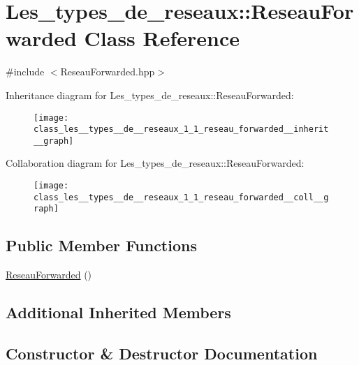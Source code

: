 \hypertarget{class_les__types__de__reseaux_1_1_reseau_forwarded}{}\section{Les\+\_\+types\+\_\+de\+\_\+reseaux\+:\+:Reseau\+Forwarded Class Reference}
\label{class_les__types__de__reseaux_1_1_reseau_forwarded}


{\ttfamily \#include $<$Reseau\+Forwarded.\+hpp$>$}



Inheritance diagram for Les\+\_\+types\+\_\+de\+\_\+reseaux\+:\+:Reseau\+Forwarded\+:\nopagebreak
\begin{figure}[H]
\begin{center}
\leavevmode
\texttt{[image: class\_les\_\_types\_\_de\_\_reseaux\_1\_1\_reseau\_forwarded\_\_inherit\_\_graph]}
\end{center}
\end{figure}


Collaboration diagram for Les\+\_\+types\+\_\+de\+\_\+reseaux\+:\+:Reseau\+Forwarded\+:\nopagebreak
\begin{figure}[H]
\begin{center}
\leavevmode
\texttt{[image: class\_les\_\_types\_\_de\_\_reseaux\_1\_1\_reseau\_forwarded\_\_coll\_\_graph]}
\end{center}
\end{figure}
\subsection*{Public Member Functions}
\begin{DoxyCompactItemize}
\item 
\hyperlink{class_les__types__de__reseaux_1_1_reseau_forwarded_aebce929c314e9dbfcce8e234cb132083}{Reseau\+Forwarded} ()
\end{DoxyCompactItemize}
\subsection*{Additional Inherited Members}


\subsection{Constructor \& Destructor Documentation}
\mbox{\label{class_les__types__de__reseaux_1_1_reseau_forwarded_aebce929c314e9dbfcce8e234cb132083}} 
